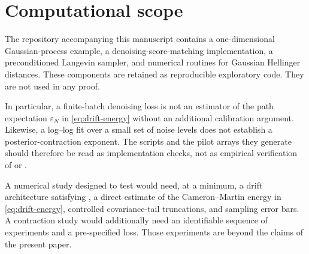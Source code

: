 \section{Computational scope}
\label{sec:experiments}

The repository accompanying this manuscript contains a one-dimensional
Gaussian-process example, a denoising-score-matching implementation,
a preconditioned Langevin sampler, and numerical routines for Gaussian
Hellinger distances.  These components are retained as reproducible
exploratory code.  They are not used in any proof.

In particular, a finite-batch denoising loss is not an estimator of the
path expectation $\varepsilon_N$ in \eqref{eq:drift-energy} without an
additional calibration argument.  Likewise, a log--log fit over a
small set of noise levels does not establish a posterior-contraction
exponent.  The scripts and the pilot arrays they generate should
therefore be read as implementation checks, not as empirical
verification of  or .

A numerical study designed to test  would need, at a
minimum, a drift architecture satisfying , a direct
estimate of the Cameron--Martin energy in
\eqref{eq:drift-energy}, controlled covariance-tail truncations, and
sampling error bars.  A contraction study would additionally need an
identifiable sequence of experiments and a pre-specified loss.  Those
experiments are beyond the claims of the present paper.
